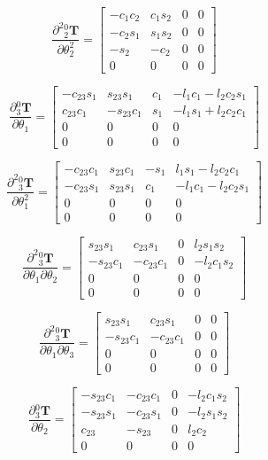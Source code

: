 \documentclass{homework}
\begin{document}
\begin{sol}
\[
  \frac{\partial^2 {_2^0}\mathbf{T}}{\partial \theta_2^2} =
  \begin{bmatrix} 
    -c_{1} c_{2} & c_{1} s_{2} & 0 & 0 \\ 
    -c_{2} s_{1} & s_{1} s_{2} & 0 & 0 \\ 
    -s_{2} & -c_{2} & 0 & 0 \\ 
    0 & 0 & 0 & 0
  \end{bmatrix}
\]

\[
  \frac{\partial {_3^0}\mathbf{T}}{\partial \theta_1} =
  \begin{bmatrix} 
    -c_{23} s_{1} & s_{23} s_{1} & c_{1} & -l_{1} c_{1} - l_{2} c_{2} s_{1} \\ 
    c_{23} c_{1} & -s_{23} c_{1} & s_{1} & -l_{1} s_{1} + l_{2} c_{2} c_{1} \\ 
    0 & 0 & 0 & 0 \\ 
    0 & 0 & 0 & 0
  \end{bmatrix}
\]

\[
  \frac{\partial^2 {_3^0}\mathbf{T}}{\partial \theta_1^2} =
  \begin{bmatrix} 
    -c_{23} c_{1} & s_{23} c_{1} & -s_{1} & l_{1} s_{1} - l_{2} c_{2} c_{1} \\ 
    -c_{23} s_{1} & s_{23} s_{1} & c_{1} & -l_{1} c_{1} - l_{2} c_{2} s_{1} \\ 
    0 & 0 & 0 & 0 \\ 
    0 & 0 & 0 & 0
  \end{bmatrix}
\]

\[
  \frac{\partial^2 {_3^0}\mathbf{T}}{\partial \theta_1 \partial \theta_2} =
  \begin{bmatrix} 
    s_{23} s_{1} & c_{23} s_{1} & 0 & l_{2} s_{1} s_{2} \\ 
    -s_{23} c_{1} & -c_{23} c_{1} & 0 & -l_{2} c_{1} s_{2} \\ 
    0 & 0 & 0 & 0 \\ 
    0 & 0 & 0 & 0
  \end{bmatrix}
\]

\[
  \frac{\partial^2 {_3^0}\mathbf{T}}{\partial \theta_1 \partial \theta_3} =
  \begin{bmatrix} 
    s_{23} s_{1} & c_{23} s_{1} & 0 & 0 \\ 
    -s_{23} c_{1} & -c_{23} c_{1} & 0 & 0 \\ 
    0 & 0 & 0 & 0 \\ 
    0 & 0 & 0 & 0
  \end{bmatrix}
\]

\[
  \frac{\partial {_3^0}\mathbf{T}}{\partial \theta_2} =
  \begin{bmatrix} 
    -s_{23} c_{1} & -c_{23} c_{1} & 0 & - l_{2} c_{1} s_{2} \\ 
    -s_{23} s_{1} & -c_{23} s_{1} & 0 & - l_{2} s_{1} s_{2} \\ 
    c_{23} & -s_{23} & 0 & l_{2} c_{2} \\ 
    0 & 0 & 0 & 0
  \end{bmatrix}
\]


\end{sol}
\end{document}
